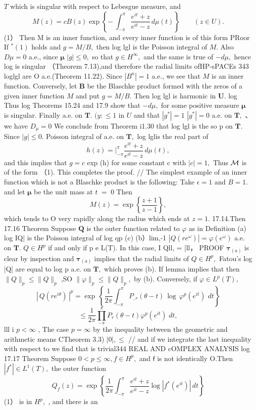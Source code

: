 ${\mathbf{}}T$ which is singular with respect to Lebesgue measure, and $$ M(z)=c B(z)\exp\left\{-\ \int_{-\pi}^{\pi}{\frac{e^{i t}+z}{e^{i t}-z}}\,d\mu(t)\right\}\qquad(z\in U). $$ (1） Then M is an inner function, and every inner function is of this form PRoor If $^{*}(1)$ holds and $g=M/B,$ then log lgl is the Poisson integral of $M.$ Also $D\mu=0$ a.e., since ${\boldsymbol{\mu}}$ $|g|\leq0,$ so that $g\in H^{\infty},$ and the same is true of $-d\mu,$ hence log is singular （Theorem 7.13),and therefore the radial limits ofHP-sPACEs 343 loglgl are O a.e.(Theorem 11.22). Since $|B^{n}|=1$ a.e., we see that $\textstyle{M}$ is an inner function. Conversely, let $\boldsymbol{B}$ be the Blaschke product formed with the zeros of a given inner function $\textstyle{M}$ and put $g=M/B.$ Then log lgl is harmonic in ${\boldsymbol{U}}.$ log Thus log Theorems 15.24 and 17.9 show that $-d\mu,$ for some positive measure ${\boldsymbol{\mu}}$ is singular. Finally a.e. on ${\boldsymbol{T}}.$ $\scriptstyle(y\colon\leq1$ in $U$ and that $|g^{*}|=1$ $|g^{*}|=0$ a.e. on ${\boldsymbol{T}},$ 、 we have $\scriptstyle D_{\mu}=0$ We conclude from Theorem i1.30 that log lgl is the so p on ${\boldsymbol{T}}.$ Since $|g|\leq0.$ Poisson integral of a.e. on ${\boldsymbol{T}},$ log lglis the real part of $$ h(z)=\left.\right|_{-\pi}^{\pi}\frac{e^{i t}+z}{e^{i t}-z}\,d\mu(t), $$ and this implies that $g=c$ exp (h) for some constant c with $|c|=1,$ Thus ${\cal{M}}$ is of the form （1). This completes the proof. // The simplest example of an inner function which is not a Blaschke product is the following: Take $\scriptstyle\epsilon=1$ and $\scriptstyle B=1.$ and let $\boldsymbol{\mu}$ be the unit mass at $\scriptstyle t\;=\;0$ Then $$ M(z)=\exp{\left\{{\frac{z+1}{z-1}}\right\}}, $$ which tends to O very rapidly along the radius which ends at $z=1.$ 17.14.Then 17.16 Theorem Suppose ${\boldsymbol{Q}}$ is the outer function related to $\varphi$ as in Definition (a) log IQ| is the Poisson integral of log qp (c) (b）lim,-1 $|Q(r e^{\omega})|=\varphi(e^{\omega})$ a.e. on ${\boldsymbol{T}}.$ $Q\in H^{p}$ if and only if p e L(T). In this case, I Qll, = |ll， PROOF $\mathbf{\tau}_{(a)}$ is clear by inspection and $\mathbf{\tau}_{(a)}$ implies that the radial limits of $Q\in H^{p},$ Fatou's log |Q| are equal to log p a.e. on ${\boldsymbol{T}},$ which proves (b). If lemma implies that then $\|Q\|_{p}\leq\|Q\|_{p}$ ,SO $\|\varphi\|_{p}\leq\|Q\|_{p},$ by (b). Conversely, if $\varphi\in L^{p}(T),$ $$ |\,Q(r e^{i\theta})\,|^{p}=\exp\,\left\{\frac{1}{2\pi}\int_{-\pi}^{\pi}P_{,r}(\theta-t)\,\log\,\varphi^{p}(e^{i t})\,\,d t\right\} $$ $$ \leq{\frac{1}{2\pi}}\prod_{-\pi}^{\pi}P_{r}(\theta-t)\varphi^{p}(e^{i t})\;d t, $$ lll i $p<\infty$ , The case $p=\infty$ by the inequality between the geometric and arithmetic means CTheorem 3.3) $|0|,\leq$ // and if we integrate the last inequality with respect to we find that is trivial344 REAL AND cOMPLEX ANALYSIS log 17.17 Theorem Suppose $0<p\leq\infty,f\in H^{p},$ and $\boldsymbol{\mathsf{f}}$ is not identically O.Then $|f^{*}|\in L^{1}(T),$ the outer function $$ Q_{f}(z)=\exp\left\{{\frac{1}{2\pi}}\int_{-\pi}^{\pi}{\frac{e^{i t}+z}{e^{i t}-z}}\log\left|f^{*}(e^{i t})\right|\,d t\right\} $$ (1） is in $H^{p},$ , and there is an 